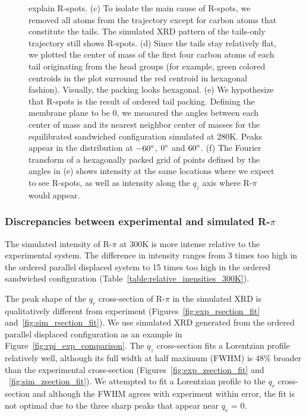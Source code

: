 \documentclass[journal=jpcbfk,manuscript=article]{achemso}
\begin{document}
\begin{figure}[!htb]
{      explain R-spots. (c) To isolate the main cause of R-spots, we removed all atoms
      from the trajectory except for carbon atoms that constitute the tails. The
      simulated XRD pattern of the tails-only trajectory still shows R-spots. (d)
      Since the tails stay relatively flat, we plotted the center of mass of the first
      four carbon atoms of each tail originating from the head groups (for example,
      green colored centroids in the plot surround the red centroid in hexagonal fashion).
      Visually, the packing looks hexagonal. (e) We hypothesize
      that R-spots is the result of ordered tail packing. Defining
      the membrane plane to be 0\degree, we measured the angles between each center of 
      mass and its nearest neighbor center of masses for the equilibrated 
      sandwiched configuration simulated at 280K. Peaks appear in the distribution at 
      $-60\degree$, $0\degree$ and $60\degree$. (f) The Fourier transform of a hexagonally
      packed grid of points defined by the angles in (e) shows intensity at the same
      locations where we expect to see R-spots, as well as intensity along the $q_z$ axis
      where R-$\pi$ would appear.}~\label{fig:tail_packing}
  \end{figure}  
  
  \subsubsection{Discrepancies between experimental and simulated R-$\pi$}\label{section:rpi}
  The simulated intensity of R-$\pi$ at 300K is more intense relative to the experimental 
  system. The difference in intensity ranges from 3 times too high in the ordered parallel
  displaced system to 15 times too high in the ordered sandwiched configuration 
  (Table~\ref{table:relative_inensities_300K}).

  The peak shape of the $q_r$ cross-section of R-$\pi$ in the simulated XRD is qualitatively different
  from experiment (Figures~\ref{fig:exp_rsection_fit} and~\ref{fig:sim_rsection_fit}).
  We use simulated XRD generated from the ordered parallel displaced configuration
  as an example in Figure~\ref{fig:rpi_exp_comparison}. The $q_z$ cross-section 
  fits a Lorentzian profile relatively well, although its full width at half maximum
  (FWHM) is 48\% broader than the experimental cross-section 
  (Figures~\ref{fig:exp_zsection_fit} and ~\ref{fig:sim_zsection_fit}). We attempted
  to fit a Lorentzian profile to the $q_r$ cross-section and although the FWHM agrees
  with experiment within error, the fit is not optimal due to the three sharp peaks
  that appear near $q_r$ = 0. 
  
\end{document}
